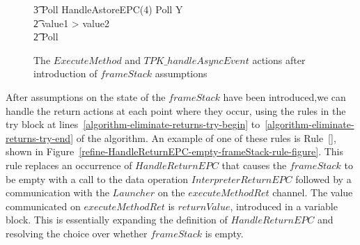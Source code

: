 \begin{figure}[t!]
\begin{circusaction}
    \t3 Poll \circseq HandleAstoreEPC(4) \circseq Poll \circseq Y \\
    \t2 {} \circelse value1 > value2 \circthen \Skip \\
    \t2 \circfi \circseq Poll
  \end{circusaction}
  \caption{The $ExecuteMethod$ and $TPK\_handleAsyncEvent$ actions
    after introduction of $frameStack$ assumptions}
  \label{efs-return-assumption-distribution-figure}
\end{figure}

After assumptions on the state of the $frameStack$ have been
introduced,we can handle the return actions at each point where they
occur, using the rules in the try block at
lines~\ref{algorithm-eliminate-returns-try-begin}
to~\ref{algorithm-eliminate-returns-try-end} of the algorithm.
An example of one of these rules is
Rule~[], shown
in Figure~\ref{refine-HandleReturnEPC-empty-frameStack-rule-figure}.
This rule replaces an occurrence of $HandleReturnEPC$ that causes the
$frameStack$ to be empty with a call to the data operation
$InterpreterReturnEPC$ followed by a communication with the $Launcher$
on the $executeMethodRet$ channel.
The value communicated on $executeMethodRet$ is $returnValue$,
introduced in a variable block.
This is essentially expanding the definition of $HandleReturnEPC$ and
resolving the choice over whether $frameStack$ is empty.

